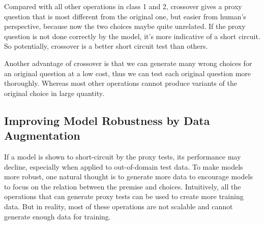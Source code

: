 
Compared with all other operations in class 1 and 2, 
crossover gives a proxy question that is most different from the original one,
but easier from human's perspective, because now the two choices maybe
quite unrelated. If the proxy question is not done correctly by the model, 
it's more indicative of a short circuit. So potentially, crossover
is a better short circuit test than others. 


Another advantage of crossover is that we can generate many wrong choices 
for an original question at a low cost, thus we can test each original question
more thoroughly. Whereas most other operations cannot produce 
variants of the original choice in large quantity. 

\subsection{Improving Model Robustness by Data Augmentation}
\label{sec:aug}
If a model is shown to short-circuit by the proxy tests, 
its performance may decline, especially when applied to out-of-domain test data.
To make models more robust, one natural thought is to generate more data to encourage models to focus on the 
relation between the premise and choices.
Intuitively, all the operations that can generate proxy tests
can be used to create more training data.
But in reality, most of these operations are not scalable and 
cannot generate enough data for training. 

